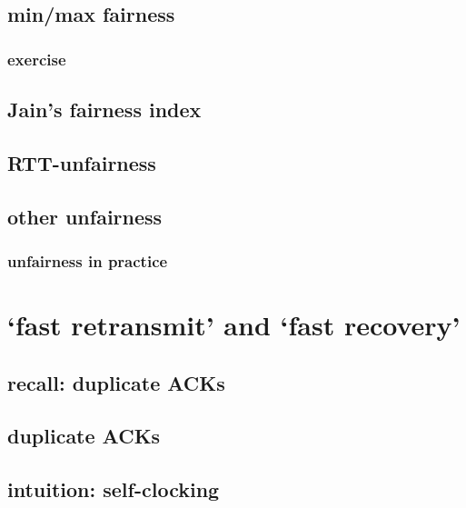 \subsection{min/max fairness}


\subsubsection{exercise}


\subsection{Jain's fairness index}


\subsection{RTT-unfairness}


\subsection{other unfairness}


\subsubsection{unfairness in practice}


\section{`fast retransmit' and `fast recovery'}

\subsection{recall: duplicate ACKs}


\subsection{duplicate ACKs}

\subsection{intuition: self-clocking}



%


